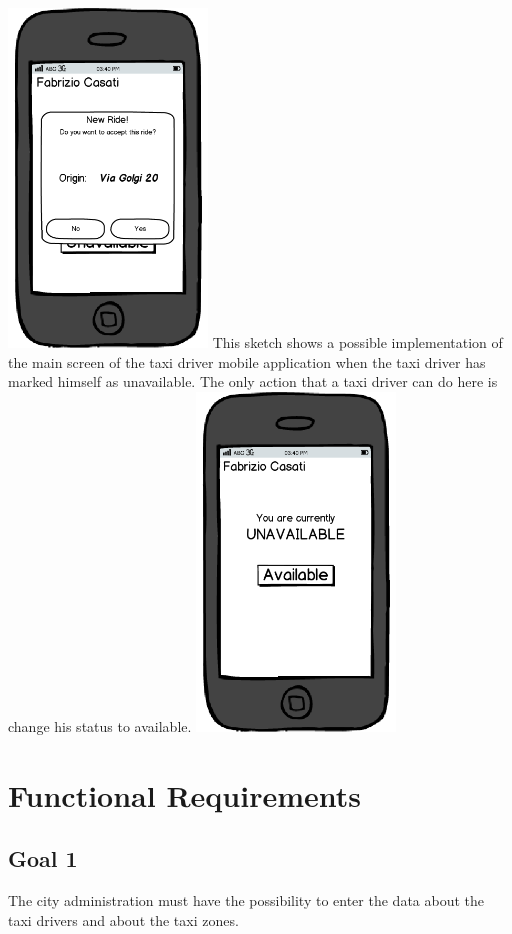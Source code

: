 \begin{center}
\includegraphics[width=150pt,keepaspectratio]{images/taxi_new_ride.png}
{This sketch shows a possible implementation of the main screen of the taxi driver mobile application when the taxi driver has marked himself as unavailable. The only action that a taxi driver can do here is change his status to available.}
\includegraphics[width=150pt,keepaspectratio]{images/taxi_unavailable.png}

\end{center}



\section{Functional Requirements}
\subsection{Goal 1}
The city administration must have the possibility to enter the data about the taxi drivers and about the taxi zones. 

